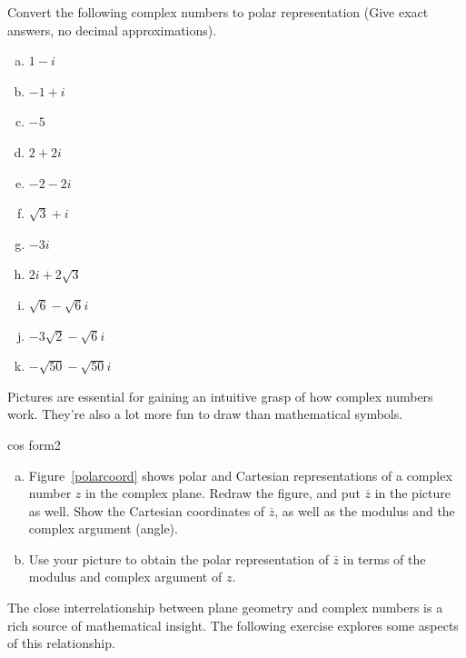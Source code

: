 \begin{exercise}{22}
Convert the following complex numbers to polar representation (Give exact answers, no decimal approximations).
\begin{multicols}{3}
\begin{enumerate}[(a)]
 
 \item
$1-i$
\item
$-1 + i$
 \item
$-5$
 \item
$2+2i$
\item
$-2 - 2i$
\item
$\sqrt{3} + i$
 \item
$-3i$
 \item
$2i + 2 \sqrt{3}$
\item
$\sqrt{6} - \sqrt{6}i$
\item
$-3\sqrt{2} - \sqrt{6}i$
\item
$-\sqrt{50} - \sqrt{50}i$
  
\end{enumerate}
\end{multicols}
\end{exercise}

Pictures are essential for gaining an intuitive grasp of how complex numbers work. They're also a lot more fun to draw than mathematical symbols. 

\begin{exercise}{cos form2}
\begin{enumerate}[(a)]
\item
Figure~\ref{polarcoord} shows  polar and Cartesian representations of a complex number $z$  in the complex plane.  Redraw the figure, and put $\overline{z}$ in the picture as well. Show the Cartesian coordinates of $\overline{z}$, as well as the modulus and the complex argument (angle).
\item
Use your picture to obtain the polar representation of $\bar{z}$ in terms of the modulus and complex argument of $z$.
\end{enumerate}
\end{exercise}



The close interrelationship between plane geometry and complex numbers is a rich source of mathematical insight.  The following exercise explores some aspects of this relationship. 


